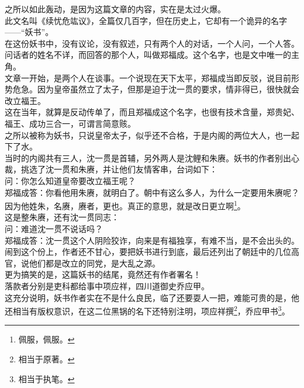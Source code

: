 \begin{multicols}{\theparacolNo}
之所以如此轰动，是因为这篇文章的内容，实在是太过火爆。\\

此文名叫《续忧危竑议》，全篇仅几百字，但在历史上，它却有一个诡异的名字——“妖书”。\\

在这份妖书中，没有议论，没有叙述，只有两个人的对话，一个人问，一个人答。问话者的姓名不详，而回答的那个人，叫做郑福成。这个名字，也是文中唯一的主角。\\

文章一开始，是两个人在谈事。一个说现在天下太平，郑福成当即反驳，说目前形势危急。因为皇帝虽然立了太子，但那是迫于沈一贯的要求，情非得已，很快就会改立福王。\\

这在当年，就算是反动传单了，而且郑福成这个名字，也很有技术含量，郑贵妃、福王、成功三合一，可谓言简意赅。\\

之所以被称为妖书，只说皇帝太子，似乎还不合格，于是内阁的两位大人，也一起下了水。\\

当时的内阁共有三人，沈一贯是首辅，另外两人是沈鲤和朱赓。妖书的作者别出心裁，挑选了沈一贯和朱赓，并让他们友情客串，台词如下：\\

问：你怎么知道皇帝要改立福王呢？\\

郑福成答：你看他用朱赓，就明白了。朝中有这么多人，为什么一定要用朱赓呢？因为他姓朱，名赓，赓者，更也。真正的意思，就是改日更立啊\footnote{佩服，佩服。}。\\

这是整朱赓，还有沈一贯同志：\\

问：难道沈一贯不说话吗？\\

郑福成答：沈一贯这个人阴险狡诈，向来是有福独享，有难不当，是不会出头的。\\

闹到这个份上，作者还不甘心，要把妖书进行到底，最后还列出了朝廷中的几位高官，说他们都是改立的同党，是大乱之源。\\

更为搞笑的是，这篇妖书的结尾，竟然还有作者署名！\\

落款者分别是吏科都给事中项应祥，四川道御史乔应甲。\\

这充分说明，妖书作者实在不是什么良民，临了还要耍人一把，难能可贵的是，他还相当有版权意识，在这二位黑锅的名下还特别注明，项应祥撰\footnote{相当于原著。}，乔应甲书\footnote{相当于执笔。}。\\


\end{multicols}
